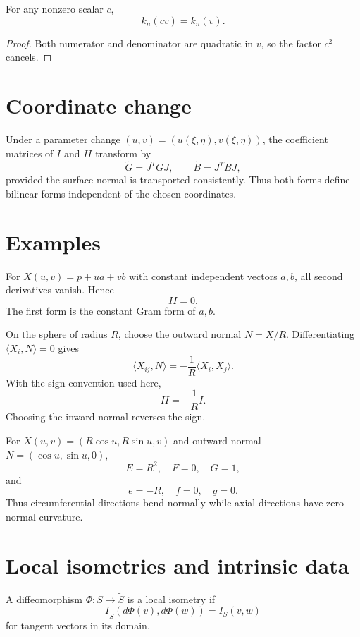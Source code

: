 \begin{proposition}\label{prop:vii15-direction}
For any nonzero scalar \(c\),
\[
k_n(cv)=k_n(v).
\]
\end{proposition}
\begin{proof}
Both numerator and denominator are quadratic in \(v\), so the factor \(c^2\) cancels.
\end{proof}

\section{Coordinate change}
\begin{theorem}\label{thm:vii15-transform}
Under a parameter change \((u,v)=(u(\xi,\eta),v(\xi,\eta))\), the coefficient matrices of \(I\) and \(II\) transform by
\[
\widetilde G=J^T GJ,\qquad
\widetilde B=J^T BJ,
\]
provided the surface normal is transported consistently.  Thus both forms define bilinear forms independent of the chosen coordinates.
\end{theorem}

\section{Examples}
\begin{example}[Plane]\label{ex:vii15-plane}
For \(X(u,v)=p+ua+vb\) with constant independent vectors \(a,b\), all second derivatives vanish.  Hence
\[
II=0.
\]
The first form is the constant Gram form of \(a,b\).
\end{example}

\begin{example}[Sphere]\label{ex:vii15-sphere}
On the sphere of radius \(R\), choose the outward normal \(N=X/R\).  Differentiating \(\langle X_i,N\rangle=0\) gives
\[
\langle X_{ij},N\rangle=-\frac1R\langle X_i,X_j\rangle.
\]
With the sign convention used here,
\[
II=-\frac1R I.
\]
Choosing the inward normal reverses the sign.
\end{example}

\begin{example}[Cylinder]\label{ex:vii15-cylinder}
For \(X(u,v)=(R\cos u,R\sin u,v)\) and outward normal \(N=(\cos u,\sin u,0)\),
\[
E=R^2,\quad F=0,\quad G=1,
\]
and
\[
e=-R,\quad f=0,\quad g=0.
\]
Thus circumferential directions bend normally while axial directions have zero normal curvature.
\end{example}

\section{Local isometries and intrinsic data}
\begin{definition}\label{def:vii15-local-isometry}
A diffeomorphism \(\Phi:S\to\widetilde S\) is a local isometry if
\[
I_{\widetilde S}(d\Phi(v),d\Phi(w))=I_S(v,w)
\]
for tangent vectors in its domain.
\end{definition}

